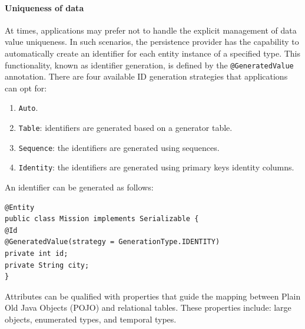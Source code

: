 \paragraph*{Uniqueness of data}
At times, applications may prefer not to handle the explicit management of data value uniqueness. 
In such scenarios, the persistence provider has the capability to automatically create an identifier for each entity instance of a specified type. 
This functionality, known as identifier generation, is defined by the \texttt{@GeneratedValue} annotation. 
There are four available ID generation strategies that applications can opt for:
\begin{enumerate}
    \item \texttt{Auto}. 
    \item \texttt{Table}: identifiers are generated based on a generator table.
    \item \texttt{Sequence}: the identifiers are generated using sequences. 
    \item \texttt{Identity}: the identifiers are generated using primary keys identity columns. 
\end{enumerate}
\begin{example}
    An identifier can be generated as follows: 
    \begin{lstlisting}[style=Java]
@Entity
public class Mission implements Serializable {
@Id
@GeneratedValue(strategy = GenerationType.IDENTITY)
private int id;
private String city;
}
    \end{lstlisting}
\end{example}
Attributes can be qualified  with properties that guide the mapping between Plain Old Java Objects (POJO) and relational tables. 
These properties include: large objects, enumerated types, and temporal types. 

